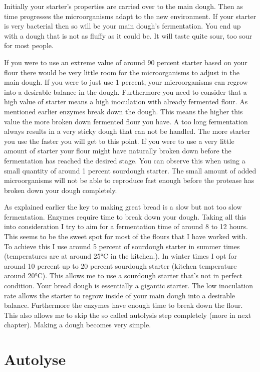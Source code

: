 Initially your starter's properties are carried over to the main dough. Then
as time progresses the microorganisms adapt to the new environment. If your
starter is very bacterial then so will be your main dough's fermentation. You
end up with a dough that is not as fluffy as it could be. It will taste quite
sour, too sour for most people.

If you were to use an extreme value of around 90 percent starter based on your flour there
would be very little room for the microorganisms to adjust in the main dough.
If you were to just use 1 percent, your microorganisms can regrow into a
desirable balance in the dough. Furthermore you need to consider that a high value
of starter means a high inoculation with already fermented flour. As
mentioned earlier enzymes break down the dough. This means the higher this
value the more broken down fermented flour you have. A too long fermentation
always results in a very sticky dough that can not be handled. The more
starter you use the faster you will get to this point. If you were to use a
very little amount of starter your flour might have naturally broken down
before the fermentation has reached the desired stage. You can observe this
when using a small quantity of around 1 percent sourdough starter. The small
amount of added microorganisms will not be able to reproduce fast enough
before the protease has broken down your dough completely.

As explained earlier the key to making great bread is a slow but not too slow
fermentation. Enzymes require time to break down your dough. Taking all this
into consideration I try to aim for a fermentation time of around 8 to 12 hours. This seems to be
the sweet spot for most of the flours that I have worked with. To achieve this
I use around 5 percent of sourdough starter in summer times (temperatures are
at around 25°C in the kitchen.). In winter times I opt for around 10 percent
up to 20 percent sourdough starter (kitchen temperature around 20°C). This
allows me to use a sourdough starter that's not in perfect condition. Your
bread dough is essentially a gigantic starter. The low inoculation rate allows
the starter to regrow inside of your main dough into a desirable balance.
Furthermore the enzymes have enough time to break down the flour. This also
allows me to skip the so called autolysis step completely (more in next chapter).
Making a dough becomes very simple.

\section{Autolyse}

